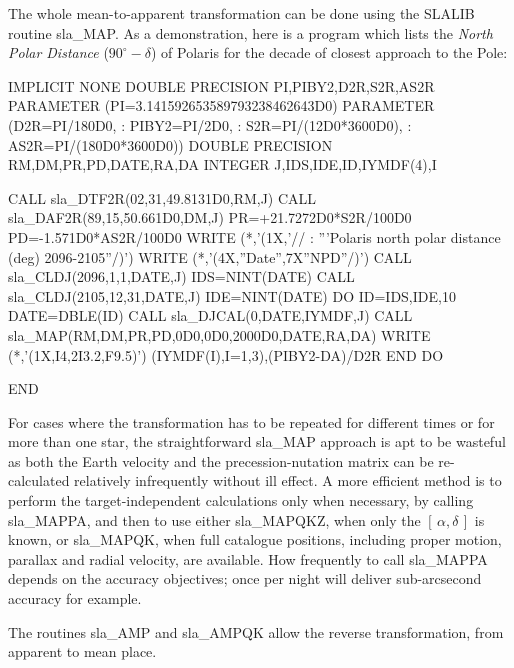 \documentclass[11pt,twoside,nolof]{starlink}
\providecommand{\radec}     {$[\,\alpha,\delta\,]$}
\begin{document}
The whole mean-to-apparent transformation can be done using the SLALIB
routine
sla\_MAP.  As a demonstration, here is a program which lists the
\textit{North Polar Distance}\/ ($90^\circ-\delta$) of Polaris for
the decade of closest approach to the Pole:
\goodbreak
\begin{terminalv}
            IMPLICIT NONE
            DOUBLE PRECISION PI,PIBY2,D2R,S2R,AS2R
            PARAMETER (PI=3.141592653589793238462643D0)
            PARAMETER (D2R=PI/180D0,
           :           PIBY2=PI/2D0,
           :           S2R=PI/(12D0*3600D0),
           :           AS2R=PI/(180D0*3600D0))
            DOUBLE PRECISION RM,DM,PR,PD,DATE,RA,DA
            INTEGER J,IDS,IDE,ID,IYMDF(4),I

            CALL sla_DTF2R(02,31,49.8131D0,RM,J)
            CALL sla_DAF2R(89,15,50.661D0,DM,J)
            PR=+21.7272D0*S2R/100D0
            PD=-1.571D0*AS2R/100D0
            WRITE (*,'(1X,'//
           :            '''Polaris north polar distance (deg) 2096-2105''/)')
            WRITE (*,'(4X,''Date'',7X''NPD''/)')
            CALL sla_CLDJ(2096,1,1,DATE,J)
            IDS=NINT(DATE)
            CALL sla_CLDJ(2105,12,31,DATE,J)
            IDE=NINT(DATE)
            DO ID=IDS,IDE,10
               DATE=DBLE(ID)
               CALL sla_DJCAL(0,DATE,IYMDF,J)
               CALL sla_MAP(RM,DM,PR,PD,0D0,0D0,2000D0,DATE,RA,DA)
               WRITE (*,'(1X,I4,2I3.2,F9.5)') (IYMDF(I),I=1,3),(PIBY2-DA)/D2R
            END DO

            END
\end{terminalv}
\goodbreak
For cases where the transformation has to be repeated for different
times or for more than one star, the straightforward
sla\_MAP
approach is apt to be
wasteful as both the Earth velocity and the
precession-nutation matrix can be re-calculated relatively
infrequently without ill effect.  A more efficient method is to
perform the target-independent calculations only when necessary,
by calling
sla\_MAPPA,
and then to use either
sla\_MAPQKZ,
when only the \radec\/ is known, or
sla\_MAPQK,
when full catalogue positions, including proper motion, parallax and
radial velocity, are available.  How frequently to call
sla\_MAPPA
depends on the accuracy objectives;  once per
night will deliver sub-arcsecond accuracy for example.

The routines
sla\_AMP
and
sla\_AMPQK
allow the reverse transformation, from apparent to mean place.
\end{document}
